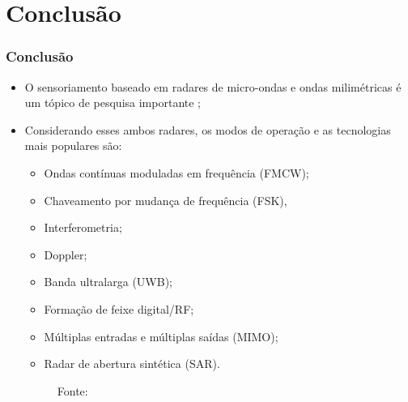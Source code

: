\documentclass[xcolor=dvipsnames, aspectratio=169]{beamer}
\begin{document}
\section[Conclusão]{Conclusão} 
\begin{frame}
\frametitle{Conclusão}
	\begin{itemize}
		\item O sensoriamento baseado em radares de micro-ondas e ondas milimétricas é um tópico de pesquisa importante \cite{cardillo_2023};
        \item Considerando esses ambos radares, os modos de operação e as tecnologias mais populares são:
        \begin{itemize}
            \item Ondas contínuas moduladas em frequência (FMCW); 
            \item Chaveamento por mudança de frequência (FSK), 
            \item Interferometria; 
            \item Doppler;
            \item Banda ultralarga (UWB); 
            \item Formação de feixe digital/RF;
            \item Múltiplas entradas e múltiplas saídas (MIMO);
            \item Radar de abertura sintética (SAR).
        \end{itemize}

        \begin{figure}
            \centering
            {Fonte: \cite{cardillo_2023}}
            \label{fig:tc_microwave}
        \end{figure}

	\end{itemize}
\end{frame}


\begin{frame}
    \printbibliography
\end{frame}


\begin{frame}
\titlepage %
\end{frame}
\end{document}
